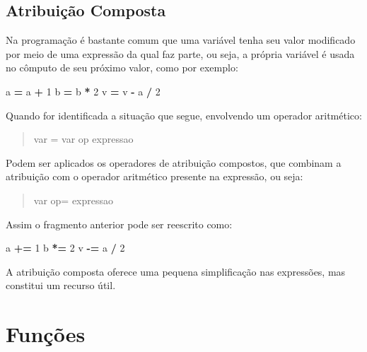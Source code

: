 \documentclass[
]{book}
\newenvironment{Shaded}{\begin{snugshade}}{\end{snugshade}}
\newcommand{\DecValTok}[1]{\textcolor[rgb]{0.00,0.00,0.81}{#1}}
\newcommand{\NormalTok}[1]{#1}
\newcommand{\OperatorTok}[1]{\textcolor[rgb]{0.81,0.36,0.00}{\textbf{#1}}}
\begin{document}
\hypertarget{comput-atrib-compo}{%
\subsection{Atribuição Composta}\label{comput-atrib-compo}}

Na programação é bastante comum que uma variável tenha seu valor modificado por meio de uma expressão da qual faz parte, ou seja, a própria variável é usada no cômputo de seu próximo valor, como por exemplo:

\begin{Shaded}
\begin{Highlighting}[]
\NormalTok{a }\OperatorTok{=}\NormalTok{ a }\OperatorTok{+} \DecValTok{1}
\NormalTok{b }\OperatorTok{=}\NormalTok{ b }\OperatorTok{*} \DecValTok{2}
\NormalTok{v }\OperatorTok{=}\NormalTok{ v }\OperatorTok{{-}}\NormalTok{ a }\OperatorTok{/} \DecValTok{2}
\end{Highlighting}
\end{Shaded}

Quando for identificada a situação que segue, envolvendo um operador aritmético:

\begin{quote}
var = var op expressao
\end{quote}

Podem ser aplicados os operadores de atribuição compostos, que combinam a atribuição com o operador aritmético presente na expressão, ou seja:

\begin{quote}
var op= expressao
\end{quote}

Assim o fragmento anterior pode ser reescrito como:

\begin{Shaded}
\begin{Highlighting}[]
\NormalTok{a }\OperatorTok{+=} \DecValTok{1}
\NormalTok{b }\OperatorTok{*=} \DecValTok{2}
\NormalTok{v }\OperatorTok{{-}=}\NormalTok{ a }\OperatorTok{/} \DecValTok{2}
\end{Highlighting}
\end{Shaded}

A atribuição composta oferece uma pequena simplificação nas expressões, mas constitui um recurso útil.

\hypertarget{comput-funcao}{%
\section{Funções}\label{comput-funcao}}
\end{document}
